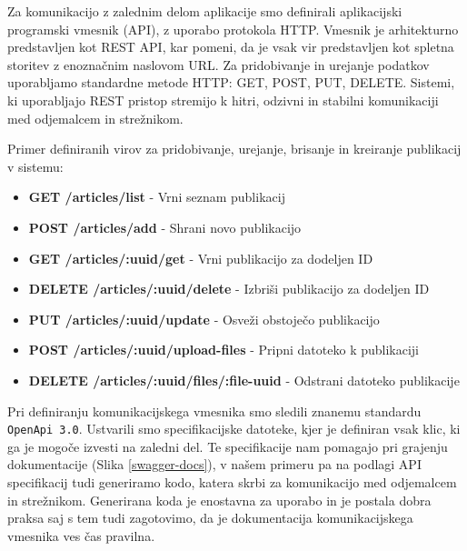 \documentclass[a4paper, 12pt]{book}
\begin{document}
Za komunikacijo z zalednim delom aplikacije smo definirali aplikacijski programski vmesnik (API), z uporabo protokola HTTP. Vmesnik je arhitekturno predstavljen kot REST API, kar pomeni, da je vsak vir predstavljen kot spletna storitev z enoznačnim naslovom URL. Za pridobivanje in urejanje podatkov uporabljamo standardne metode HTTP: GET, POST, PUT, DELETE. Sistemi, ki uporabljajo REST pristop stremijo k hitri, odzivni in stabilni komunikaciji med odjemalcem in strežnikom.

Primer definiranih virov za pridobivanje, urejanje, brisanje in kreiranje publikacij v sistemu:
\begin{description}

\begin{itemize}
\item \textbf{GET /articles/list} - Vrni seznam publikacij
\item \textbf{POST /articles/add} - Shrani novo publikacijo
\item \textbf{GET /articles/:uuid/get} - Vrni publikacijo za dodeljen ID
\item \textbf{DELETE /articles/:uuid/delete} - Izbriši publikacijo za dodeljen ID
\item \textbf{PUT /articles/:uuid/update} - Osveži obstoječo publikacijo
\item \textbf{POST /articles/:uuid/upload-files} - Pripni datoteko k publikaciji
\item \textbf{DELETE /articles/:uuid/files/:file-uuid} - Odstrani datoteko publikacije
\end{itemize}
\end{description}

Pri definiranju komunikacijskega vmesnika smo sledili znanemu standardu \verb=OpenApi 3.0=. Ustvarili smo specifikacijske datoteke, kjer je definiran vsak klic, ki ga je mogoče izvesti na zaledni del. Te specifikacije nam pomagajo pri grajenju dokumentacije (Slika \ref{swagger-docs}), v našem primeru pa na podlagi API specifikacij tudi generiramo kodo, katera skrbi za komunikacijo med odjemalcem in strežnikom. Generirana koda je enostavna za uporabo in je postala dobra praksa saj s tem tudi zagotovimo, da je dokumentacija komunikacijskega vmesnika ves čas pravilna.
\end{document}

